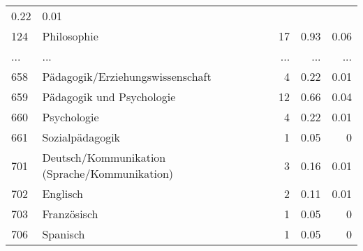 \begin{longtable}{lXrrr}
          \num[round-mode=places,round-precision=2]{0.22} &
          \num[round-mode=places,round-precision=2]{0.01} \\
        124 & \multicolumn{1}{X}{Philosophie} & %
          \num{17} &
          \num[round-mode=places,round-precision=2]{0.93} &
          \num[round-mode=places,round-precision=2]{0.06} \\
       ... & ... & ... & ... & ... \\
        658 & \multicolumn{1}{X}{Pädagogik/Erziehungswissenschaft} & %
          \num{4} &
          \num[round-mode=places,round-precision=2]{0.22} &
          \num[round-mode=places,round-precision=2]{0.01} \\

        659 & \multicolumn{1}{X}{Pädagogik und Psychologie} & %
          \num{12} &
          \num[round-mode=places,round-precision=2]{0.66} &
          \num[round-mode=places,round-precision=2]{0.04} \\

        660 & \multicolumn{1}{X}{Psychologie} & %
          \num{4} &
          \num[round-mode=places,round-precision=2]{0.22} &
          \num[round-mode=places,round-precision=2]{0.01} \\

        661 & \multicolumn{1}{X}{Sozialpädagogik} & %
          \num{1} &
          \num[round-mode=places,round-precision=2]{0.05} &
          \num[round-mode=places,round-precision=2]{0} \\

        701 & \multicolumn{1}{X}{Deutsch/Kommunikation (Sprache/Kommunikation)} & %
          \num{3} &
          \num[round-mode=places,round-precision=2]{0.16} &
          \num[round-mode=places,round-precision=2]{0.01} \\

        702 & \multicolumn{1}{X}{Englisch} & %
          \num{2} &
          \num[round-mode=places,round-precision=2]{0.11} &
          \num[round-mode=places,round-precision=2]{0.01} \\

        703 & \multicolumn{1}{X}{Französisch} & %
          \num{1} &
          \num[round-mode=places,round-precision=2]{0.05} &
          \num[round-mode=places,round-precision=2]{0} \\

        706 & \multicolumn{1}{X}{Spanisch} & %
          \num{1} &
          \num[round-mode=places,round-precision=2]{0.05} &
          \num[round-mode=places,round-precision=2]{0} \\


\end{longtable}
